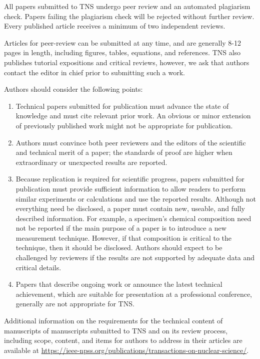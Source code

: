 \documentclass{IEEEtran}
\begin{document}
All papers submitted to TNS undergo peer review and an automated plagiarism
check. Papers failing the plagiarism check will be rejected without further
review. Every published article receives a minimum of two independent
reviews.

Articles for peer-review can be submitted at any time, and are generally 8-12 
pages in length, including figures, tables, equations, and references. TNS
also publishes tutorial expositions and critical reviews, however, we ask
that authors contact the editor in chief prior to submitting such a work.

Authors should consider the following points:

\begin{enumerate}
\item Technical papers submitted for publication must advance the state of knowledge and must cite relevant prior work. An obvious or minor extension of previously published work might not be appropriate for publication.
\item Authors must convince both peer reviewers and the editors of the scientific and technical merit of a paper; the standards of proof are higher when extraordinary or unexpected results are reported.
\item Because replication is required for scientific progress, papers submitted for publication must provide sufficient information to allow readers to perform similar experiments or calculations and use the reported results. Although not everything need be disclosed, a paper must contain new, useable, and fully described information. For example, a specimen's chemical composition need not be reported if the main purpose of a paper is to introduce a new measurement technique. However, if that composition is critical to the technique, then it should be disclosed. Authors should expect to be challenged by reviewers if the results are not supported by adequate data and critical details.
\item Papers that describe ongoing work or announce the latest technical achievement, which are suitable for presentation at a professional conference, generally are not appropriate for TNS.
\end{enumerate}

Additional information on the requirements for the technical content of
manuscripts of manuscripts submitted to TNS and on its review process,
including scope, content, and items for authors to address in their articles
are available at \underline
{https://}\discretionary{}{}{}\underline{ieee-npss.org/publications/transactions-on-nuclear-science/}.
\end{document}
